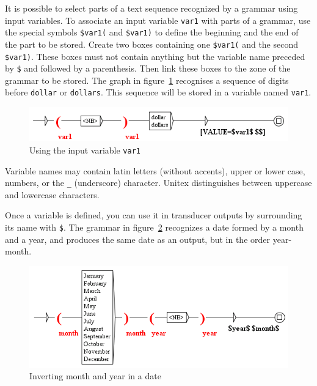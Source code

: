It is possible to select parts of a text sequence recognized by a grammar using input
variables. To associate an input variable \verb+var1+ with parts of a grammar, use the special
symbols \verb+$var1(+ and \verb+$var1)+ to define the beginning and the end of
the part to be stored. Create two boxes containing one \verb+$var1(+ and the second
\verb+$var1)+. These boxes must not contain anything but the variable name
preceded by \verb+$+ and followed by a parenthesis. Then link these boxes to the
zone of the grammar to be stored. The graph in
figure~\ref{fig-using-variable} recognises a sequence of digits before
\verb+dollar+ or \verb+dollars+. This sequence will be stored in a variable named
\verb+var1+.

\bigskip
\begin{figure}[h]
\begin{center}
\includegraphics[width=13.5cm]{resources/img/fig5-16.png}
\caption{Using the input variable
\texttt{var1}\label{fig-using-variable}}
\end{center}
\end{figure}

\noindent Variable names may contain latin letters (without accents), upper or
lower case, numbers, or the \verb+_+ (underscore) character.\index{\verb+_+} Unitex distinguishes between uppercase and lowercase characters.

\bigskip
\noindent Once a variable is defined, you can use it in transducer outputs by
surrounding its name with \verb+$+.\index{\verb+$+} The grammar in
figure~\ref{fig-date-grammar} recognizes a date formed by a month and a
year, and produces the same date as an output, but in the order year-month.

\bigskip
\begin{figure}[h]
\begin{center}
\includegraphics[width=14.5cm]{resources/img/fig5-17.png}
\caption{Inverting month and year in a date\label{fig-date-grammar}}
\end{center}
\end{figure}

